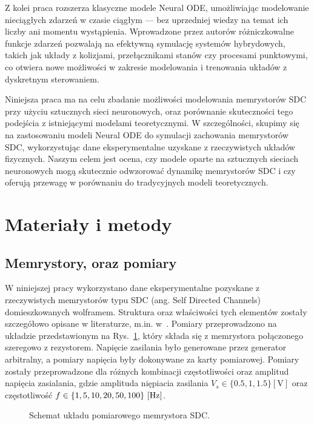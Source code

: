 \documentclass[11pt, oneside]{article}
\begin{document}
Z kolei praca \cite{Ricky2021} rozszerza klasyczne modele Neural ODE, umożliwiając modelowanie nieciągłych zdarzeń w czasie ciągłym — bez uprzedniej wiedzy na temat ich liczby ani momentu wystąpienia. Wprowadzone przez autorów różniczkowalne funkcje zdarzeń pozwalają na efektywną symulację systemów hybrydowych, takich jak układy z kolizjami, przełącznikami stanów czy procesami punktowymi, co otwiera nowe możliwości w zakresie modelowania i trenowania układów z dyskretnym sterowaniem.


Niniejsza praca ma na celu zbadanie możliwości modelowania memrystorów SDC przy użyciu sztucznych sieci neuronowych, oraz porównanie skuteczności tego podejścia z istniejącymi modelami teoretycznymi. W szczególności, skupimy się na zastosowaniu modeli Neural ODE do symulacji zachowania memrystorów SDC, wykorzystując dane eksperymentalne uzyskane z rzeczywistych układów fizycznych. Naszym celem jest ocena, czy modele oparte na sztucznych sieciach neuronowych mogą skutecznie odwzorować dynamikę memrystorów SDC i czy oferują przewagę w porównaniu do tradycyjnych modeli teoretycznych.

\section{Materiały i metody}

\subsection{Memrystory, oraz pomiary}
W niniejszej pracy wykorzystano dane eksperymentalne pozyskane z rzeczywistych memrystorów typu SDC (ang. Self Directed Channels) domieszkowanych wolframem. Struktura oraz właściwości tych elementów zostały szczegółowo opisane w literaturze, m.in. w~\cite{Garda2024, Campbell2017}. Pomiary przeprowadzono na układzie przedstawionym na Rys.~\ref{fig:memristor_setup}, który składa się z memrystora połączonego szeregowo z rezystorem. Napięcie zasilania było generowane przez generator arbitralny, a pomiary  napięcia były dokonywane za karty pomiarowej. Pomiary zostały przeprowadzone dla różnych kombinacji częstotliwości oraz amplitud napięcia zasialania, gdzie amplituda niępiacia zasilania $V_s \in \{ 0.5, 1, 1.5 \} \mathrm{[V]}$ oraz częstotliwość $f \in \{ 1, 5, 10, 20, 50, 100 \} \ {\rm [Hz]}$.

\begin{figure}[H]
    \centering
    \resizebox{0.5\linewidth}{!}{%
        }
    \vspace{-0.5in}
    \caption{Schemat układu pomiarowego memrystora SDC.}
    \label{fig:memristor_setup}
\end{figure}
\end{document}
